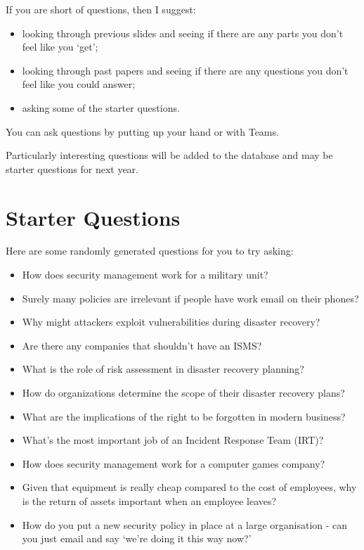 \documentclass[12pt]{article}
\begin{document}
If you are short of questions, then I suggest: 

\begin{itemize} 
\item looking through previous slides and seeing if there are any parts you don't feel like you `get';
\item looking through past papers and seeing if there are any questions you don't feel like you could answer;
\item asking some of the starter questions.
\end{itemize} 

You can ask questions by putting up your hand or with Teams.  

Particularly interesting questions will be added to the database and may be starter questions for next year.  

\section*{Starter Questions} 
Here are some randomly generated questions for you to try asking: 

\begin{itemize}
  \item How does security management work for a military unit?
  \item Surely many policies are irrelevant if people have work email on their phones?
  \item Why might attackers exploit vulnerabilities during disaster recovery?
  \item Are there any companies that shouldn't have an ISMS?
  \item What is the role of risk assessment in disaster recovery planning?
  \item How do organizations determine the scope of their disaster recovery plans?
  \item What are the implications of the right to be forgotten in modern business?
  \item What's the most important job of an Incident Response Team (IRT)?
  \item How does security management work for a computer games company?
  \item Given that equipment is really cheap compared to the cost of employees, why is the return of assets important when an employee leaves?
  \item How do you put a new security policy in place at a large organisation - can you just email and say `we're doing it this way now?'
\end{itemize}
\end{document}
